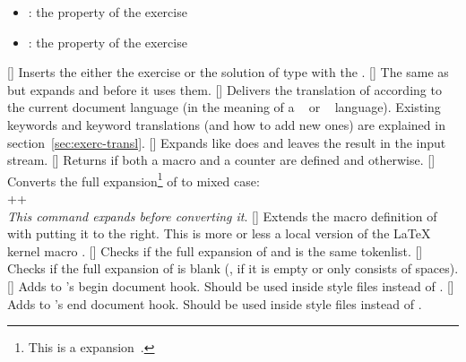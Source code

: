 \documentclass{xsim-manual}
\begin{document}
\begin{commands}
\begin{itemize}
      \item {}: the  property of the exercise
      \item {}: the  property of the exercise
    \end{itemize}
  []
    Inserts the either the exercise or the solution of type
     with the  .
  []
    The same as  but expands  and
     before it uses them.
  \expandable{}[]
    Delivers the translation of  according to the current
    document language (in the meaning of a ~\cite{pkg:babel} or
    ~\cite{pkg:polyglossia} language).  Existing keywords and
    keyword translations (and how to add new ones) are explained in
    section~\vref{sec:exerc-transl}.
  []
    Expands  like  does and leaves the result in the
    input stream.
  \expandable{}[]
    Returns  if both a macro  and a counter
     are defined and  otherwise.
  []
    Converts the full expansion\footnote{This is a 
      expansion~\cite{texsx:romannumeral}.\label{fn:romannumeral}} of
     to mixed case: \\
    \verbcode++  \\
    \emph{This command expands  before converting it}.
  []
    Extends the macro definition of  with  putting it
    to the right.  This is more or less a local version of the LaTeX kernel
    macro .
  \expandable{}[]
    Checks if the full expansion of  and
     is the same tokenlist.
  \expandable{}[]
    Checks if the full expansion of  is
    blank (\ie, if it is empty or only consists of spaces).
  []
    Adds  to \xsim's begin document hook.
    Should be used inside style files instead of .
  []
    Adds  to \xsim's end document hook.
    Should be used inside style files instead of .
\end{commands}
\end{document}
